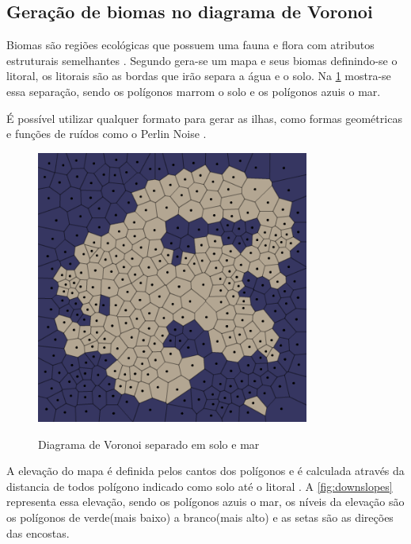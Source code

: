 \subsection{Geração de biomas no diagrama de Voronoi}
\label{sec:geracao_procedural_biomas}

Biomas são regiões ecológicas que possuem uma fauna e flora com atributos estruturais semelhantes \cite{maestrovirtuale}. Segundo  gera-se um mapa e seus biomas definindo-se o litoral, os litorais são as bordas que irão separa a água e o solo. Na \cref{fig:voronoi-land-water} mostra-se essa separação, sendo os polígonos marrom o solo e os polígonos azuis o mar.

É possível utilizar qualquer formato para gerar as ilhas, como formas geométricas e funções de ruídos como o Perlin Noise \cite{amitp2010}.

\begin{figure}[ht]
	\caption{Diagrama de Voronoi separado em solo e mar}
	\centering %
	\includegraphics[width=0.8\textwidth]{figures/voronoi-land-water.png} %
	\label{fig:voronoi-land-water}
\end{figure}

A elevação do mapa é definida pelos cantos dos polígonos e é calculada através da distancia de todos polígono indicado como solo até o litoral \cite{amitp2010}. A \cref{fig:downslopes} representa essa elevação, sendo os polígonos azuis o mar, os níveis da elevação são os polígonos de verde(mais baixo) a branco(mais alto) e as setas são as direções das encostas.

